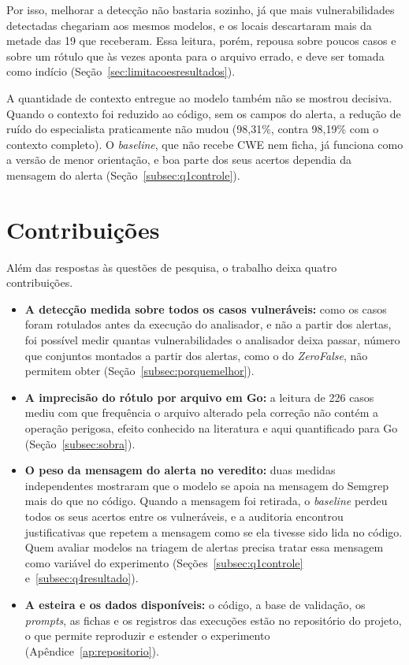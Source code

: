 Por isso, melhorar a detecção não bastaria sozinho, já que mais vulnerabilidades detectadas chegariam aos mesmos modelos, e os locais descartaram mais da metade das 19 que receberam. Essa leitura, porém, repousa sobre poucos casos e sobre um rótulo que às vezes aponta para o arquivo errado, e deve ser tomada como indício (Seção~\ref{sec:limitacoesresultados}).

A quantidade de contexto entregue ao modelo também não se mostrou decisiva. Quando o contexto foi reduzido ao código, sem os campos do alerta, a redução de ruído do especialista praticamente não mudou (98,31\%, contra 98,19\% com o contexto completo). O \textit{baseline}, que não recebe CWE nem ficha, já funciona como a versão de menor orientação, e boa parte dos seus acertos dependia da mensagem do alerta (Seção~\ref{subsec:q1controle}).

\section{Contribuições}
\label{sec:contribuicoes}

Além das respostas às questões de pesquisa, o trabalho deixa quatro contribuições.

\begin{itemize}
    \item \textbf{A detecção medida sobre todos os casos vulneráveis:} como os casos foram rotulados antes da execução do analisador, e não a partir dos alertas, foi possível medir quantas vulnerabilidades o analisador deixa passar, número que conjuntos montados a partir dos alertas, como o do \textit{ZeroFalse}, não permitem obter (Seção~\ref{subsec:porquemelhor}).
    \item \textbf{A imprecisão do rótulo por arquivo em Go:} a leitura de 226 casos mediu com que frequência o arquivo alterado pela correção não contém a operação perigosa, efeito conhecido na literatura e aqui quantificado para Go (Seção~\ref{subsec:sobra}).
    \item \textbf{O peso da mensagem do alerta no veredito:} duas medidas independentes mostraram que o modelo se apoia na mensagem do Semgrep mais do que no código. Quando a mensagem foi retirada, o \textit{baseline} perdeu todos os seus acertos entre os vulneráveis, e a auditoria encontrou justificativas que repetem a mensagem como se ela tivesse sido lida no código. Quem avaliar modelos na triagem de alertas precisa tratar essa mensagem como variável do experimento (Seções~\ref{subsec:q1controle} e~\ref{subsec:q4resultado}).
    \item \textbf{A esteira e os dados disponíveis:} o código, a base de validação, os \textit{prompts}, as fichas e os registros das execuções estão no repositório do projeto, o que permite reproduzir e estender o experimento (Apêndice~\ref{ap:repositorio}).
\end{itemize}

